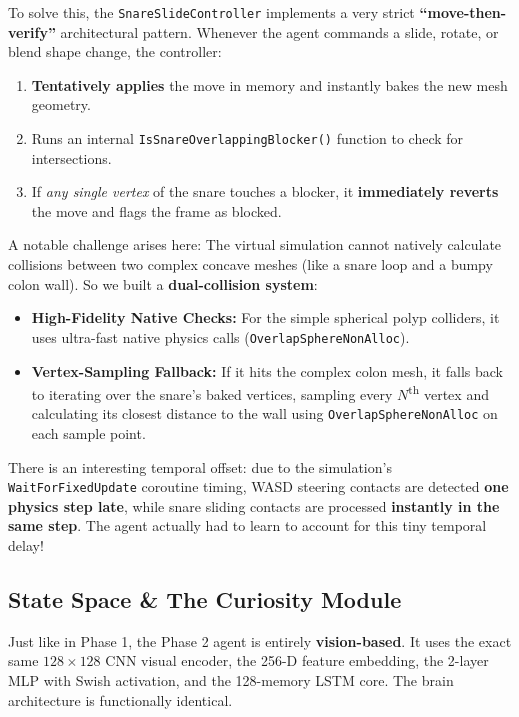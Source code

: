 To solve this, the \texttt{SnareSlideController} implements a very strict \textbf{``move-then-verify''} architectural pattern. Whenever the agent commands a slide, rotate, or blend shape change, the controller:
\begin{enumerate}
\item \textbf{Tentatively applies} the move in memory and instantly bakes the new mesh geometry.
\item Runs an internal \texttt{IsSnareOverlappingBlocker()} function to check for intersections.
\item If \textit{any single vertex} of the snare touches a blocker, it \textbf{immediately reverts} the move and flags the frame as blocked.
\end{enumerate}

A notable challenge arises here: The virtual simulation cannot natively calculate collisions between two complex concave meshes (like a snare loop and a bumpy colon wall). So we built a \textbf{dual-collision system}:
\begin{itemize}
\item \textbf{High-Fidelity Native Checks:} For the simple spherical polyp colliders, it uses ultra-fast native physics calls (\texttt{OverlapSphereNonAlloc}).
\item \textbf{Vertex-Sampling Fallback:} If it hits the complex colon mesh, it falls back to iterating over the snare's baked vertices, sampling every $N$\textsuperscript{th} vertex and calculating its closest distance to the wall using \texttt{OverlapSphereNonAlloc} on each sample point.
\end{itemize}

There is an interesting temporal offset: due to the simulation's \texttt{WaitForFixedUpdate} coroutine timing, WASD steering contacts are detected \textbf{one physics step late}, while snare sliding contacts are processed \textbf{instantly in the same step}. The agent actually had to learn to account for this tiny temporal delay!

\subsection{State Space \& The Curiosity Module}
Just like in Phase 1, the Phase 2 agent is entirely \textbf{vision-based}. It uses the exact same $128 \times 128$ CNN visual encoder, the 256-D feature embedding, the 2-layer MLP with Swish activation, and the 128-memory LSTM core. The brain architecture is functionally identical.

